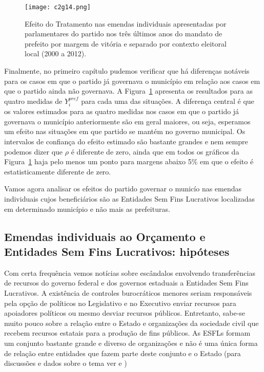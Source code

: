\begin{figure}[htp]
	\centering
	\texttt{[image: c2g14.png]}
		\caption{Efeito do Tratamento nas emendas individuais apresentadas por parlamentares do partido nos três últimos anos do mandato de prefeito por margem de vitória e separado por contexto eleitoral local (2000 a 2012).}
	\label{fig:c2g14}
\end{figure}

Finalmente, no primeiro capítulo pudemos verificar que há diferenças notáveis para os casos em que o partido já governava o município em relação aos casos em que o partido ainda não governava. A Figura~\ref{fig:c2g14} apresenta os resultados para as quatro medidas de $Y_{i}^{pref}$ para cada uma das situações. A diferença central é que os valores estimados para as quatro medidas nos casos em que o partido já governava o município anteriormente são em geral maiores, ou seja, esperamos um efeito nas situações em que partido se mantém no governo municipal. Os intervalos de confiança do efeito estimado são bastante grandes e nem sempre podemos dizer que $\rho$ é diferente de zero, ainda que em todos os gráficos da Figura~\ref{fig:c2g14} haja pelo menos um ponto para margens abaixo 5\% em que o efeito é estatisticamente diferente de zero.

Vamos agora analisar os efeitos do partido governar o municío nas emendas individuais cujos beneficiários são as Entidades Sem Fins Lucrativos localizadas em determinado município e não mais as prefeituras.

\subsection{Emendas individuais ao Orçamento e Entidades Sem Fins Lucrativos: hipóteses}

Com certa frequência vemos notícias sobre escândalos envolvendo transferências de recursos do governo federal e dos governos estaduais a Entidades Sem Fins Lucrativos. A existência de controles burocráticos menores seriam responsáveis pela opção de políticos no Legislativo e no Executivo enviar recursos para apoiadores políticos ou mesmo desviar recursos públicos. Entretanto, sabe-se muito pouco sobre a relação entre o Estado e organizações da sociedade civil que recebem recursos estatais para a produção de fins públicos. As ESFLs formam um conjunto bastante grande e diverso de organizações e não é uma única forma de relação entre entidades que fazem parte deste conjunto e o Estado (para discussões e dados sobre o tema ver \citealp*{Lopez2012} e \citealp*{Lopez2013})


